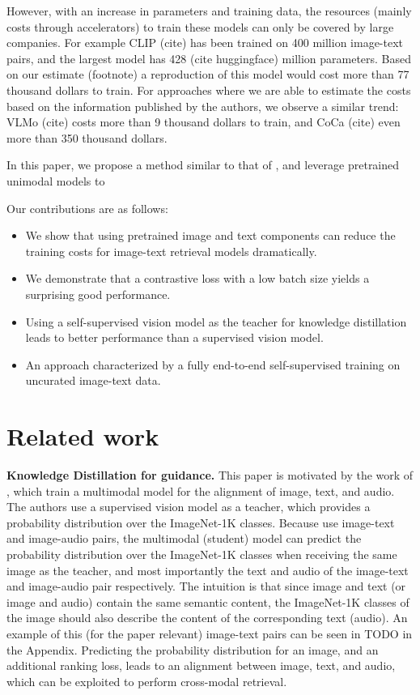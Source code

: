 \documentclass[10pt]{article} %
\begin{document}
However, with an increase in parameters and training data, the resources (mainly costs through accelerators) to train these models
can only be covered by large companies. For example CLIP (cite) has been trained on 400 million image-text pairs, and the largest
model has 428 (cite huggingface) million parameters. Based on our estimate (footnote) a reproduction of this model would cost more
than 77 thousand dollars to train. For approaches where we are able to estimate the costs based on the information published by
the authors, we observe a similar trend: VLMo (cite) costs more than 9 thousand dollars to train, and CoCa (cite) even more than
350 thousand dollars.

In this paper, we propose a method similar to that of \citet{shre}, and leverage pretrained unimodal models to 

Our contributions are as follows:
\begin{itemize}
\item We show that using pretrained image and text components can reduce the training costs for image-text retrieval models dramatically.
\item We demonstrate that a contrastive loss with a low batch size yields a surprising good performance.
\item Using a self-supervised vision model as the teacher for knowledge distillation leads to better performance than a supervised vision model.
\item An approach characterized by a fully end-to-end self-supervised training on uncurated image-text data.
\end{itemize}

\section{Related work}

\textbf{Knowledge Distillation for guidance.} This paper is motivated by the work of \citet{shre}, which train a multimodal model
for the alignment of image, text, and audio. The authors use a supervised vision model as a teacher, which provides a probability
distribution over the ImageNet-1K \citep{imagenet} classes. Because \citet{shre} use image-text and image-audio pairs, the multimodal
(student) model can predict the probability distribution over the ImageNet-1K \citep{imagenet} classes when receiving the same image
as the teacher, and most importantly the text and audio of the image-text and image-audio pair respectively. The intuition is that since
image and text (or image and audio) contain the same semantic content, the ImageNet-1K \citep{imagenet} classes of the image should also
describe the content of the corresponding text (audio). An example of this (for the paper relevant) image-text pairs can be seen in TODO
in the Appendix. Predicting the probability distribution for an image, and an additional ranking loss, leads to an alignment between image,
text, and audio, which can be exploited to perform cross-modal retrieval.
\end{document}
